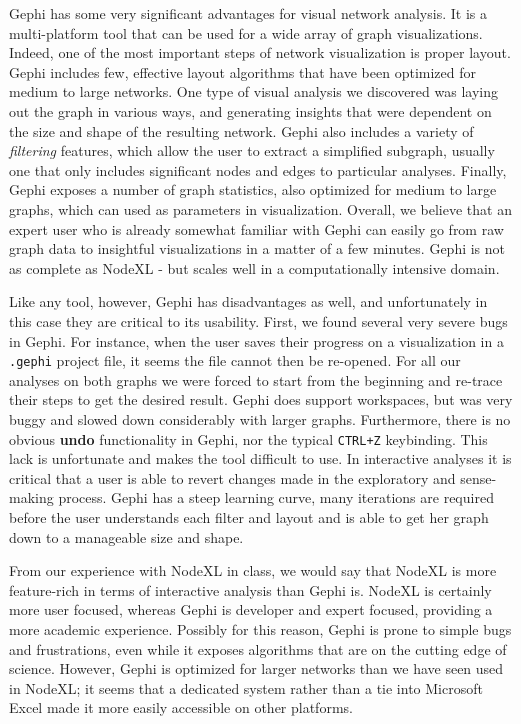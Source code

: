 \documentclass[11pt,letterpaper]{article}
\begin{document}
Gephi has some very significant advantages for visual network analysis. It is a multi-platform tool that can be used for a wide array of graph visualizations. Indeed, one of the most important steps of network visualization is proper layout. Gephi includes few, effective layout algorithms that have been optimized for medium to large networks. One type of visual analysis we discovered was laying out the graph in various ways, and generating insights that were dependent on the size and shape of the resulting network. Gephi also includes a variety of \textit{filtering} features, which allow the user to extract a simplified subgraph, usually one that only includes significant nodes and edges to particular analyses. Finally, Gephi exposes a number of graph statistics, also optimized for medium to large graphs, which can used as parameters in visualization. Overall, we believe that an expert user who is already somewhat familiar with Gephi can easily go from raw graph data to insightful visualizations in a matter of a few minutes. Gephi is not as complete as NodeXL - but scales well in a computationally intensive domain.

Like any tool, however, Gephi has disadvantages as well, and unfortunately in this case they are critical to its usability. First, we found several very severe bugs in Gephi. For instance, when the user saves their progress on a visualization in a \texttt{.gephi} project file, it seems the file cannot then be re-opened. For all our analyses on both graphs we were forced to start from the beginning and re-trace their steps to get the desired result. Gephi does support workspaces, but was very buggy and slowed down considerably with larger graphs. Furthermore, there is no obvious \textbf{undo} functionality in Gephi, nor the typical \texttt{CTRL+Z} keybinding. This lack is unfortunate and makes the tool difficult to use. In interactive analyses it is critical that a user is able to revert changes made in the exploratory and sense-making process. Gephi has a steep learning curve, many iterations are required before the user understands each filter and layout and is able to get her graph down to a manageable size and shape.

From our experience with NodeXL in class, we would say that NodeXL is more feature-rich in terms of interactive analysis than Gephi is. NodeXL is certainly more user focused, whereas Gephi is developer and expert focused, providing a more academic experience. Possibly for this reason, Gephi is prone to simple bugs and frustrations, even while it exposes algorithms that are on the cutting edge of science. However, Gephi is optimized for larger networks than we have seen used in NodeXL; it seems that a dedicated system rather than a tie into Microsoft Excel made it more easily accessible on other platforms.
\end{document}
